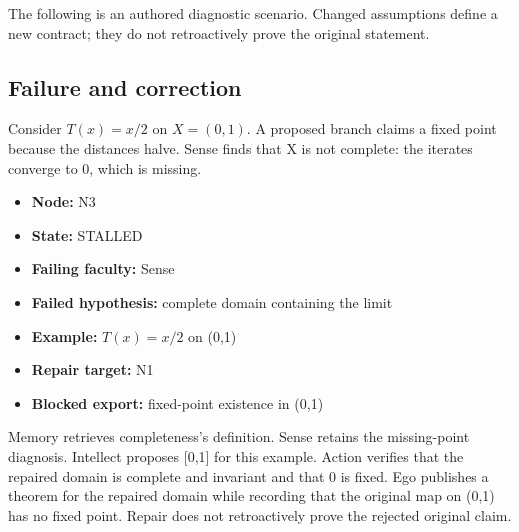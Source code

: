 \documentclass[preprint,12pt,aps,pra,showkeys,amsmath,amssymb,superscriptaddress,floatfix]{revtex4-2}
\theoremstyle{definition}
\theoremstyle{remark}
\begin{document}
The following is an authored diagnostic scenario. Changed assumptions
define a new contract; they do not retroactively prove the original
statement.

\subsection{Failure and correction}
Consider \(T(x)=x/2\) on \(X=(0,1)\). A proposed branch claims a fixed
point because the distances halve. Sense finds that X is not complete:
the iterates converge to 0, which is missing.

\begin{itemize}
\item
  \textbf{Node:} N3
\item
  \textbf{State:} STALLED
\item
  \textbf{Failing faculty:} Sense
\item
  \textbf{Failed hypothesis:} complete domain containing the limit
\item
  \textbf{Example:} \(T(x)=x/2\) on (0,1)
\item
  \textbf{Repair target:} N1
\item
  \textbf{Blocked export:} fixed-point existence in (0,1)
\end{itemize}

Memory retrieves completeness's definition. Sense retains the
missing-point diagnosis. Intellect proposes {[}0,1{]} for this example.
Action verifies that the repaired domain is complete and invariant and
that 0 is fixed. Ego publishes a theorem for the repaired domain while
recording that the original map on (0,1) has no fixed point. Repair does
not retroactively prove the rejected original claim.
\end{document}
